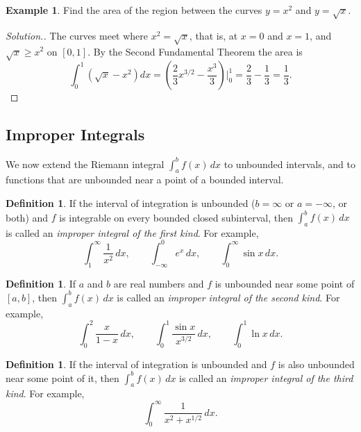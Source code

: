 \documentclass[11pt,a4paper]{article}
\numberwithin{equation}{section}
\theoremstyle{definition}
\newtheorem{defn}[thm]{Definition}
\newtheorem{exa}[thm]{Example}
\newenvironment{solution}
  {\renewcommand{\qedsymbol}{}\begin{proof}[\textit{Solution}.]}
  {\end{proof}}
\begin{document}
\begin{exa}
Find the area of the region between the curves $y = x^2$ and $y = \sqrt{x}$.
\end{exa}

\begin{solution}
The curves meet where $x^2 = \sqrt{x}$, that is, at $x = 0$ and $x = 1$, and $\sqrt{x}\geq x^2$ on $[0,1]$. By the Second Fundamental Theorem the area is
$$\int_0^1\left(\sqrt{x} - x^2\right)dx = \left(\frac{2}{3}x^{3/2} - \frac{x^3}{3}\right)\Big|_0^1 = \frac{2}{3} - \frac{1}{3} = \frac{1}{3} .$$
\end{solution}


\subsection{Improper Integrals}

We now extend the Riemann integral $\int^b_af(x)\,dx$ to unbounded intervals, and to functions that are unbounded near a point of a bounded interval.


\begin{defn}
If the interval of integration is unbounded ($b = \infty$ or $a = -\infty$, or both) and $f$ is integrable on every bounded closed subinterval, then $\int^b_af(x)\,dx$ is called an \emph{improper integral of the first kind}. For example,
$$\int^{\infty}_1\frac{1}{x^2}\, dx,\qquad  \int^0_{-\infty}e^x\,dx,\qquad  \int^{\infty}_0\sin x\, dx .$$
\end{defn}


\begin{defn}
If $a$ and $b$ are real numbers and $f$ is unbounded near some point of $[a,b]$, then $\int^b_af(x)\,dx$ is called an \emph{improper integral of the second kind}. For example,
$$\int^2_0\frac{x}{1 - x}\, dx,\qquad \int^1_0\frac{\sin x}{x^{3/2}}\,dx,\qquad \int^1_0\ln x\, dx .$$
\end{defn}


\begin{defn}
If the interval of integration is unbounded and $f$ is also unbounded near some point of it, then $\int^b_af(x)\,dx$ is called an \emph{improper integral of the third kind}. For example,
$$\int^{\infty}_0\frac{1}{x^2 + x^{1/2}}\, dx .$$
\end{defn}
\end{document}
